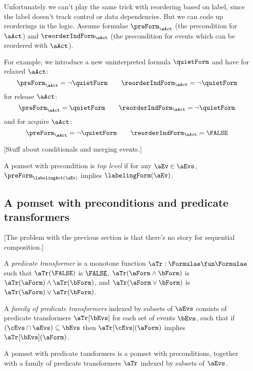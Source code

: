 Unfortunately we can't play the same trick with reordering based on
label, since the label doesn't track control or data dependencies. But
we can code up reorderings in the logic. Assume formulae
$\preForm_\aAct$ (the precondition for $\aAct$) and
$\reorderIndForm_\aAct$ (the precondition for events which can be reordered with $\aAct$).

For example, we introduce a new uninterpreted formula $\quietForm$
and have for relaxed $\aAct$:
\[
  \preForm_{\aAct} = \neg\quietForm
\qquad
  \reorderIndForm_{\aAct} = \neg\quietForm
\]
for release $\aAct$:
\[
  \preForm_{\aAct} = \quietForm
\qquad
  \reorderIndForm_{\aAct} = \neg\quietForm
\]
and for acquire $\aAct$:
\[
  \preForm_{\aAct} = \neg\quietForm
\qquad
  \reorderIndForm_{\aAct} = \FALSE
\]

[Stuff about conditionals and merging events.]

\begin{definition}
  A pomset with precondition is \emph{top level} if for any $\aEv\in\aEvs$,
  $\preForm_{\labelingAct(\aEv)}$ implies $\labelingForm(\aEv)$.
\end{definition}


\subsection{A pomset with preconditions and predicate transformers}

[The problem with the previous section is that there's no story for sequential composition.]

\begin{definition}
  A \emph{predicate transformer} is a monotone function
  $\aTr:\Formulae\fun\Formulae$ such that
  $\aTr(\FALSE)$ is $\FALSE$,
  $\aTr(\aForm\land\bForm)$ is $\aTr(\aForm)\land\aTr(\bForm)$, and
  $\aTr(\aForm\lor\bForm)$ is $\aTr(\aForm)\lor\aTr(\bForm)$.
\end{definition}

\begin{definition}
  A \emph{family of predicate transformers}
  indexed by subsets of $\aEvs$
  consists of predicate transformers
  $\aTr[\bEvs]$ for each set of events $\bEvs$,
  such that if $(\cEvs\cap\aEvs) \subseteq \bEvs$
  then $\aTr[\cEvs](\aForm)$ implies $\aTr[\bEvs](\aForm)$.
\end{definition}

\begin{definition}
  A pomset with predicate tansformers is a
  pomset with preconditions, together with a family of predicate transformers $\aTr$
  indexed by subsets of $\aEvs$.
\end{definition}

